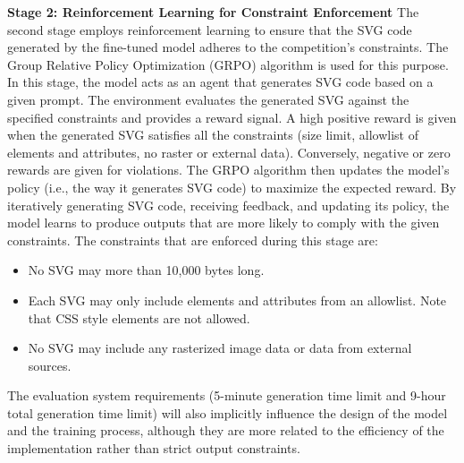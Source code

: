 \documentclass[11pt]{article}
\begin{document}
\textbf{Stage 2: Reinforcement Learning for Constraint Enforcement}
The second stage employs reinforcement learning to ensure that the SVG code generated by the fine-tuned model adheres to the competition's constraints. The Group Relative Policy Optimization (GRPO) algorithm is used for this purpose. In this stage, the model acts as an agent that generates SVG code based on a given prompt. The environment evaluates the generated SVG against the specified constraints and provides a reward signal. A high positive reward is given when the generated SVG satisfies all the constraints (size limit, allowlist of elements and attributes, no raster or external data). Conversely, negative or zero rewards are given for violations. The GRPO algorithm then updates the model's policy (i.e., the way it generates SVG code) to maximize the expected reward. By iteratively generating SVG code, receiving feedback, and updating its policy, the model learns to produce outputs that are more likely to comply with the given constraints. The constraints that are enforced during this stage are:
\begin{itemize}
    \item No SVG may more than 10,000 bytes long.
    \item Each SVG may only include elements and attributes from an allowlist. Note that CSS style elements are not allowed.
    \item No SVG may include any rasterized image data or data from external sources.
\end{itemize}
The evaluation system requirements (5-minute generation time limit and 9-hour total generation time limit) will also implicitly influence the design of the model and the training process, although they are more related to the efficiency of the implementation rather than strict output constraints.
\end{document}
